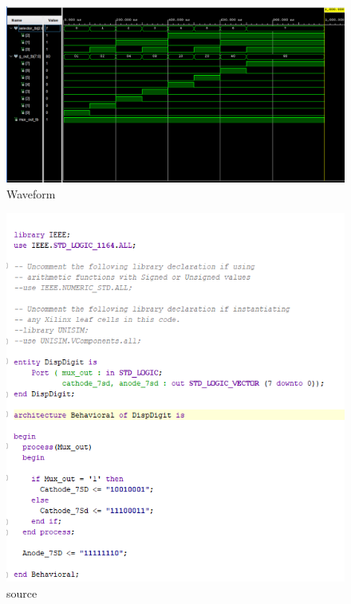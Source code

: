 \documentclass{article}
\begin{document}
\begin{figure}[h]
\begin{center}
\includegraphics[width=1\textwidth]{MultiplexerWaveForm.png} %
\caption{Waveform}
\end{center}
\end{figure}



\begin{figure}[h]
\begin{center}
\includegraphics[width=1\textwidth]{DisplaySource.png} %
\caption{source}
\end{center}
\end{figure}
\end{document}
